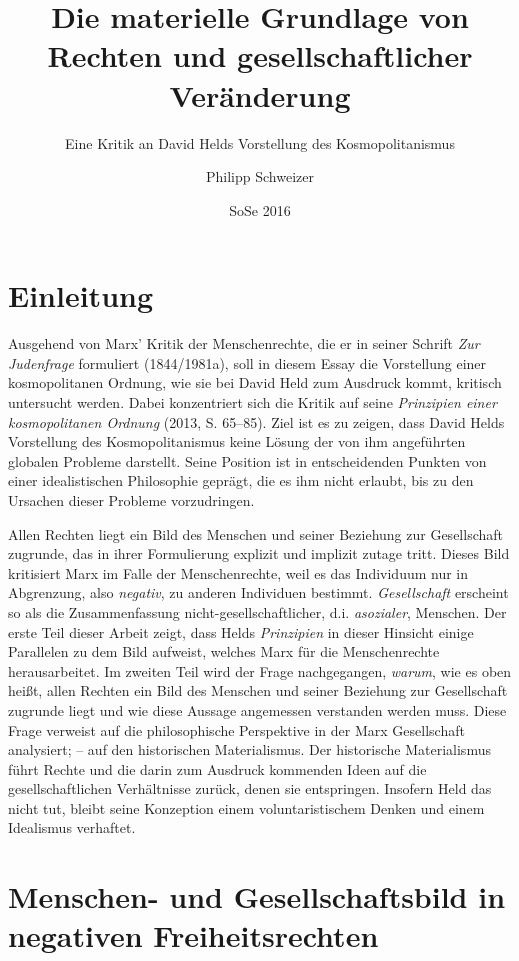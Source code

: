 \documentclass[ngerman,12pt, titlepage, smallheadings, nomath]{scrartcl}
\title{Die materielle Grundlage von Rechten und gesellschaftlicher Veränderung}
\subtitle{Eine Kritik an David Helds Vorstellung des Kosmopolitanismus}
\author{Philipp Schweizer}
\date{SoSe 2016}
\begin{document}
\maketitle

{
\setcounter{tocdepth}{3}
\tableofcontents
}
\newpage

\section{Einleitung}\label{einleitung}

Ausgehend von Marx' Kritik der Menschenrechte, die er in seiner Schrift
\emph{Zur Judenfrage} formuliert (1844/1981a), soll in diesem Essay die
Vorstellung einer kosmopolitanen Ordnung, wie sie bei David Held zum
Ausdruck kommt, kritisch untersucht werden. Dabei konzentriert sich die
Kritik auf seine \emph{Prinzipien einer kosmopolitanen Ordnung} (2013,
S. 65--85). Ziel ist es zu zeigen, dass David Helds Vorstellung des
Kosmopolitanismus keine Lösung der von ihm angeführten globalen Probleme
darstellt. Seine Position ist in entscheidenden Punkten von einer
idealistischen Philosophie geprägt, die es ihm nicht erlaubt, bis zu den
Ursachen dieser Probleme vorzudringen.

Allen Rechten liegt ein Bild des Menschen und seiner Beziehung zur
Gesellschaft zugrunde, das in ihrer Formulierung explizit und implizit
zutage tritt. Dieses Bild kritisiert Marx im Falle der Menschenrechte,
weil es das Individuum nur in Abgrenzung, also \emph{negativ}, zu
anderen Individuen bestimmt. \emph{Gesellschaft} erscheint so als die
Zusammenfassung nicht-gesellschaftlicher, d.i. \emph{asozialer},
Menschen. Der erste Teil dieser Arbeit zeigt, dass Helds
\emph{Prinzipien} in dieser Hinsicht einige Parallelen zu dem Bild
aufweist, welches Marx für die Menschenrechte herausarbeitet. Im zweiten
Teil wird der Frage nachgegangen, \emph{warum}, wie es oben heißt, allen
Rechten ein Bild des Menschen und seiner Beziehung zur Gesellschaft
zugrunde liegt und wie diese Aussage angemessen verstanden werden muss.
Diese Frage verweist auf die philosophische Perspektive in der Marx
Gesellschaft analysiert; -- auf den historischen Materialismus. Der
historische Materialismus führt Rechte und die darin zum Ausdruck
kommenden Ideen auf die gesellschaftlichen Verhältnisse zurück, denen
sie entspringen. Insofern Held das nicht tut, bleibt seine Konzeption
einem voluntaristischem Denken und einem Idealismus verhaftet.

\section{Menschen- und Gesellschaftsbild in negativen
Freiheitsrechten}\label{menschen--und-gesellschaftsbild-in-negativen-freiheitsrechten}
\end{document}
